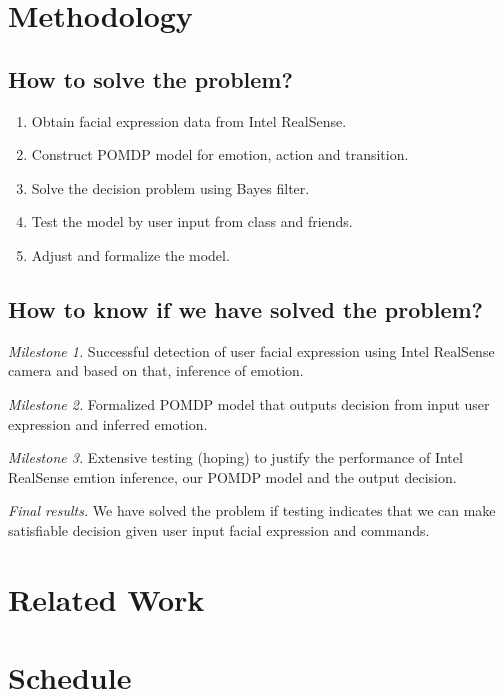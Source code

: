 \documentclass[12pt,letterpaper]{article}
\begin{document}
\section{Methodology}



\subsection{How to solve the problem?}

\begin{enumerate}
\item Obtain facial expression data from Intel RealSense.
\item Construct POMDP model for emotion, action and transition.
\item Solve the decision problem using Bayes filter.
\item Test the model by user input from class and friends.
\item Adjust and formalize the model. 
\end{enumerate}

\subsection{How to know if we have solved the problem?}
\emph{Milestone 1.} Successful detection of user facial expression using Intel RealSense camera and based on that, inference of emotion.

\emph{Milestone 2.} Formalized POMDP model that outputs decision from input user expression and inferred emotion.

\emph{Milestone 3.} Extensive testing (hoping) to justify the performance of Intel RealSense emtion inference, our POMDP model and the output decision.

\emph{Final results.} We have solved the problem if testing indicates that we can make satisfiable decision given user input facial expression and commands. 
\section{Related Work}



\newpage
\section{Schedule}
\end{document}
